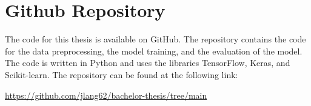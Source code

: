 \chapter{Github Repository}

The code for this thesis is available on GitHub. The repository contains the code for the data preprocessing, the model training, and the evaluation of the model. The code is written in Python and uses the libraries TensorFlow, Keras, and Scikit-learn. The repository can be found at the following link:

\url{
    https://github.com/jlang62/bachelor-thesis/tree/main
}
